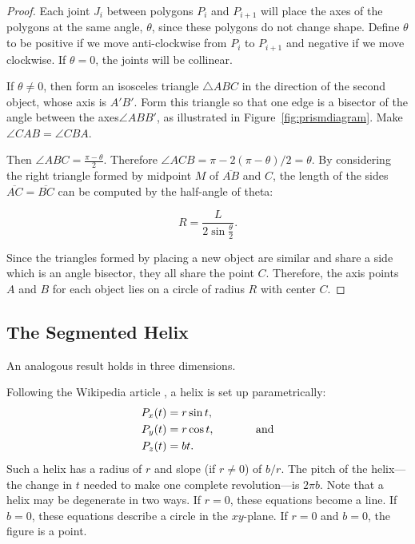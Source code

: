 \documentclass[mathematics,article,submit,pdftex,moreauthors]{Definitions/mdpi}
\begin{document}
\begin{proof}

Each joint $J_i$ between polygons $P_i$ and $P_{i+1}$ will place the axes of the polygons at the same angle, $\theta$, since
these polygons do not change shape. Define $\theta$ to be positive
if we move anti-clockwise from $P_i$ to $P_{i+1}$ and negative if we move clockwise.
If $\theta = 0$, the joints will be collinear.

If $\theta \neq 0$, then form an isosceles triangle $\triangle{ABC}$ in the direction of the second
object, whose axis is $A'B'$.
Form this triangle so that one edge is a bisector of the angle between the axes$\angle ABB'$,
as illustrated in Figure~\ref{fig:prismdiagram}.
Make $\angle CAB = \angle CBA$.

Then $\angle ABC = \frac{\pi - \theta}{2}$. Therefore $\angle ACB = \pi - 2(\pi-\theta)/2 = \theta$.
By considering the right triangle formed by midpoint $M$ of $\overline{AB}$ and $C$,
the length of the sides $\overline{AC} = \overline{BC}$ can be computed by the half-angle
of theta:
\begin{linenomath}
\begin{equation}
R = \frac{L}{2 \sin{\frac{\theta}{2}}}.
\end{equation}
\end{linenomath}
Since the triangles formed by placing a new object are similar and share a side which
is an angle bisector, they all share the point $C$. Therefore, the axis points $A$ and $B$
for each object lies on a circle of radius $R$ with center $C$.
\end{proof}


\label{sec:2d}

\subsection{The Segmented Helix}

An analogous result holds in three dimensions.

Following the Wikipedia article \cite{wiki:helix},
a helix is set up parametrically:
\begin{align}
    P_x(t) &= r \sin{t},   \\
    P_y(t) &= r \cos{t}, \text{ \hspace{3em} and}\\
   P_z(t) &= b t.
\end{align}
Such a helix has a radius of $r$ and slope (if $r \neq 0$) of $b/r$.
The pitch of the helix---the change in $t$ needed to make one complete revolution---is $2\pi b$.
Note that a helix may be degenerate in two ways.
If $r = 0$, these equations become a line. If $b = 0$, these equations describe a circle in the $xy$-plane.
If $r = 0$ and $b = 0$, the figure is a point.
\end{document}
